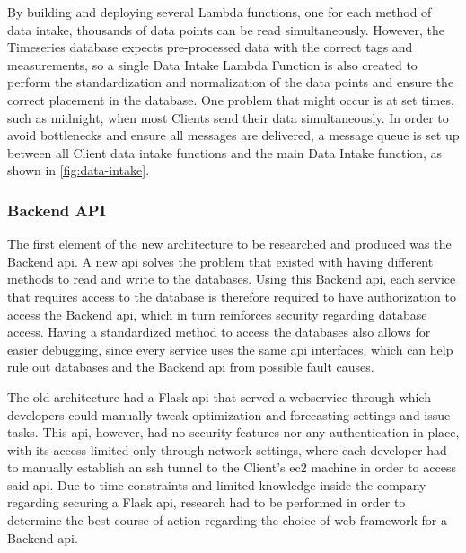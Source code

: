 By building and deploying several Lambda functions, one for each method of data intake, thousands of data points can be read simultaneously. However, the Timeseries database expects pre-processed data with the correct tags and measurements, so a single Data Intake Lambda Function is also created to perform the standardization and normalization of the data points and ensure the correct placement in the database. One problem that might occur is at set times, such as midnight, when most Clients send their data simultaneously. In order to avoid bottlenecks and ensure all messages are delivered, a message queue is set up between all Client data intake functions and the main Data Intake function, as shown in \cref{fig:data-intake}.




\subsubsection{Backend API}\label{methodology:ss:backendapi}
The first element of the new architecture to be researched and produced was the Backend \gls{api}. A new \gls{api} solves the problem that existed with having different methods to read and write to the databases. Using this Backend \gls{api}, each service that requires access to the database is therefore required to have authorization to access the Backend \gls{api}, which in turn reinforces security regarding database access. Having a standardized method to access the databases also allows for easier debugging, since every service uses the same \gls{api} interfaces, which can help rule out databases and the Backend \gls{api} from possible fault causes.

The old architecture had a Flask \gls{api} that served a webservice through which developers could manually tweak optimization and forecasting settings and issue tasks. This \gls{api}, however, had no security features nor any authentication in place, with its access limited only through network settings, where each developer had to manually establish an \gls{ssh} tunnel to the Client's \gls{ec2} machine in order to access said \gls{api}. Due to time constraints and limited knowledge inside the company regarding securing a Flask \gls{api}, research had to be performed in order to determine the best course of action regarding the choice of web framework for a Backend \gls{api}.

